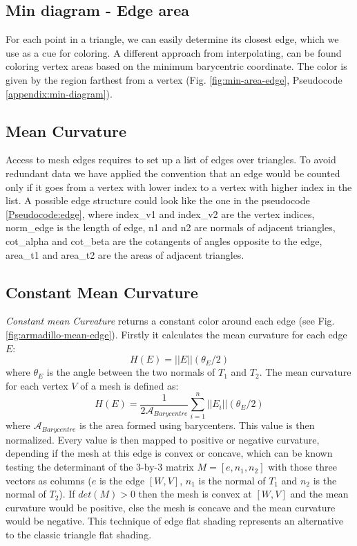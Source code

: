 \subsection{Min diagram - Edge area} \label{section:min-diagram}
For each point in a triangle, we can easily determine its closest edge, which we use as a cue for coloring.
A different approach from interpolating, can be found coloring vertex areas based on the minimum barycentric coordinate.
The color is given by the region farthest from a vertex (Fig. \ref{fig:min-area-edge}, Pseudocode \ref{appendix:min-diagram}).

\subsection{Mean Curvature} \label{section:edge-struct} \label{section:mc-curvature}
Access to mesh edges requires to set up a list of edges over triangles. To avoid redundant data we have applied the convention that an edge would be counted only if it goes from a vertex with lower index to a vertex with higher index in the list. A possible edge structure could look like the one in the pseudocode \ref{Pseudocode:edge}, where index\_v1 and index\_v2 are the vertex indices, norm\_edge is the length of edge, n1 and n2 are normals of adjacent triangles, cot\_alpha and cot\_beta are the cotangents of angles opposite to the edge, area\_t1 and area\_t2 are the areas of adjacent triangles.

\subsection{Constant Mean Curvature}
\textit{Constant mean Curvature} returns a constant color around each edge (see Fig. \ref{fig:armadillo-mean-edge}). Firstly it calculates the mean curvature for each edge $E$:
$$H(E) = || E|| (\theta_E /2)$$
where $\theta_E$ is the angle between the two normals of $T_1$ and $T_2$. The mean curvature for each vertex $V$ of a mesh is defined as:
$$H(E) = \frac{1}{2\mathcal{A}_{Barycentre}} \sum_{i = 1}^n ||E_i||(\theta_E/2)$$
where $\mathcal{A}_{Barycentre}$ is the area formed using barycenters. This value is then normalized. Every value is then mapped to positive or negative curvature, depending if the mesh at this edge is convex or concave, which can be known testing the determinant of the 3-by-3 matrix $M = [e, n_1, n_2]$ with those three vectors as
columns ($e$ is the edge $[W, V]$, $n_1$ is the normal of $T_1$ and $n_2$ is the normal of $T_2$). If $det(M) > 0$ then the mesh is convex at $[W, V]$ and the mean curvature would be positive, else the mesh is concave and the mean curvature would be negative. This technique of edge flat shading represents an alternative to the classic triangle flat shading.

